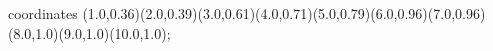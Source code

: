 					coordinates { (1.0,0.36)(2.0,0.39)(3.0,0.61)(4.0,0.71)(5.0,0.79)(6.0,0.96)(7.0,0.96)(8.0,1.0)(9.0,1.0)(10.0,1.0)};
